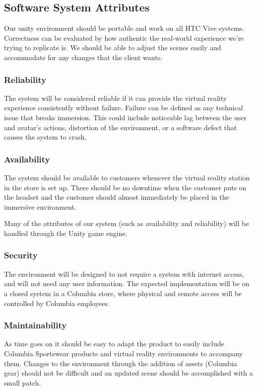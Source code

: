 \documentclass[10pt,journal,compsoc,onecolumn, draftclsnofoot]{IEEEtran}
\begin{document}
\subsection{Software System Attributes}
Our unity environment should be portable and work on all HTC Vive systems.
Correctness can be evaluated by how authentic the real-world experience we're
trying to replicate is. We should be able to adjust the scenes easily and
accommodate for any changes that the client wants.

\subsubsection{Reliability}
The system will be considered reliable if it can provide the virtual reality
experience consistently without failure. Failure can be defined as any technical
issue that breaks immersion. This could include noticeable lag between the user
and avatar's actions, distortion of the environment, or a software defect that
causes the system to crash.

\subsubsection{Availability}
The system should be available to customers whenever the virtual reality station
in the store is set up. There should be no downtime when the customer puts on
the headset and the customer should almost immediately be placed in the immersive
environment.

Many of the attributes of our system (such as availability and reliability)
will be handled through the Unity game engine.

\subsubsection{Security}
The environment will be designed to not require a system with internet access,
and will not need any user information. The expected implementation will be on
a closed system in a Columbia store, where physical and remote access will be
controlled by Columbia employees.

\subsubsection{Maintainability}
As time goes on it should be easy to adapt the product to easily include
Columbia Sportswear products and virtual reality environments to accompany them.
Changes to the environment through the addition of assets (Columbia gear)
should not be difficult and an updated scene should be accomplished with a small patch.
\end{document}
